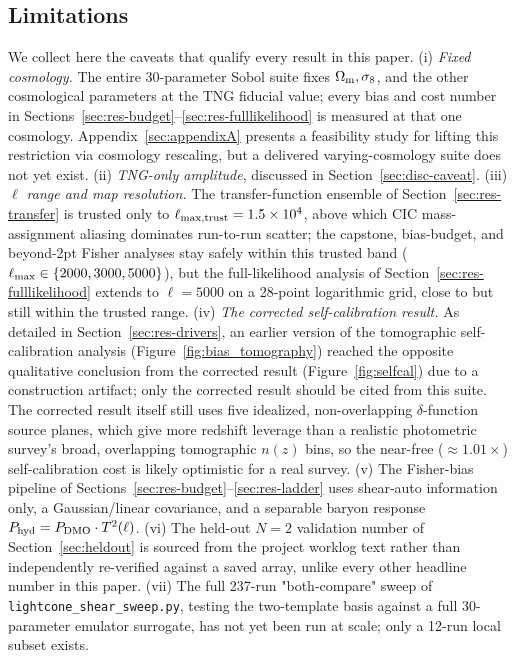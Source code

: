 \documentclass[11pt]{article}
\begin{document}
\subsection{Limitations}\label{sec:disc-limitations}

We collect here the caveats that qualify every result in this paper.
(i) \emph{Fixed cosmology.} The entire 30-parameter Sobol suite fixes
$\Omega_{\rm m},\sigma_8$, and the other cosmological parameters at the TNG
fiducial value; every bias and cost number in Sections~\ref{sec:res-budget}--\ref{sec:res-fulllikelihood}
is measured at that one cosmology. Appendix~\ref{sec:appendixA} presents a
feasibility study for lifting this restriction via cosmology rescaling, but
a delivered varying-cosmology suite does not yet exist.
(ii) \emph{TNG-only amplitude}, discussed in Section~\ref{sec:disc-caveat}.
(iii) \emph{$\ell$ range and map resolution.} The transfer-function ensemble
of Section~\ref{sec:res-transfer} is trusted only to
$\ell_{\rm max,trust}=1.5\times10^4$, above which CIC mass-assignment
aliasing dominates run-to-run scatter; the capstone, bias-budget, and
beyond-2pt Fisher analyses stay safely within this trusted band
($\ell_{\rm max}\in\{2000,3000,5000\}$), but the full-likelihood analysis of
Section~\ref{sec:res-fulllikelihood} extends to $\ell=5000$ on a 28-point
logarithmic grid, close to but still within the trusted range.
(iv) \emph{The corrected self-calibration result.} As detailed in
Section~\ref{sec:res-drivers}, an earlier version of the tomographic
self-calibration analysis (Figure~\ref{fig:bias_tomography}) reached the
opposite qualitative conclusion from the corrected result
(Figure~\ref{fig:selfcal}) due to a construction artifact; only the
corrected result should be cited from this suite. The corrected result
itself still uses five idealized, non-overlapping $\delta$-function source
planes, which give more redshift leverage than a realistic photometric
survey's broad, overlapping tomographic $n(z)$ bins, so the near-free
($\approx1.01\times$) self-calibration cost is likely optimistic for a real
survey. (v) The Fisher-bias
pipeline of Sections~\ref{sec:res-budget}--\ref{sec:res-ladder} uses
shear-auto information only, a Gaussian/linear covariance, and a separable
baryon response $P_{\rm hyd}=P_{\rm DMO}\cdot T^2(\ell)$. (vi) The held-out
$N=2$ validation number of Section~\ref{sec:heldout} is sourced from the
project worklog text rather than independently re-verified against a saved
array, unlike every other headline number in this paper. (vii) The full
237-run "both-compare" sweep of \texttt{lightcone\_shear\_sweep.py}, testing
the two-template basis against a full 30-parameter emulator surrogate, has
not yet been run at scale; only a 12-run local subset exists. %
\end{document}
